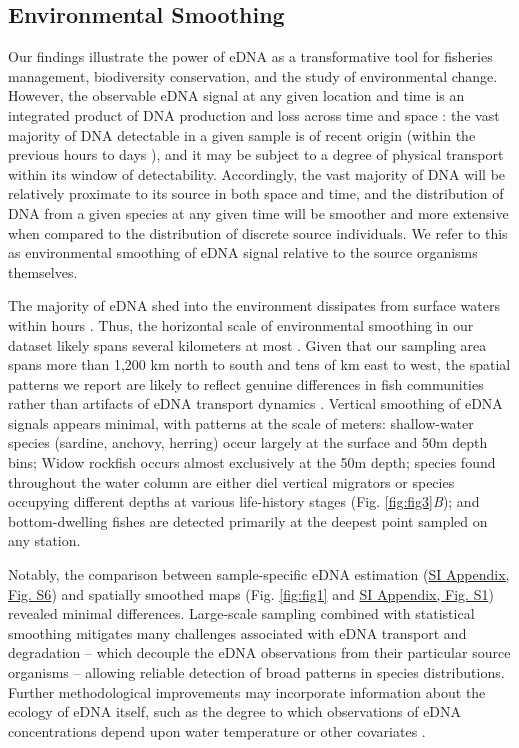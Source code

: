 \documentclass{article}
\begin{document}
\subsection*{Environmental Smoothing}
Our findings illustrate the power of eDNA as a transformative tool for fisheries management, biodiversity conservation, and the study of environmental change. However, the observable eDNA signal at any given location and time is an integrated product of DNA production and loss across time and space \cite{gold2023}: the vast majority of DNA detectable in a given sample is of recent origin (within the previous hours to days \cite{strickler2015,collins2018,machler2018}), and it may be subject to a degree of physical transport within its window of detectability. Accordingly, the vast majority of DNA will be relatively proximate to its source in both space and time, and the distribution of DNA from a given species at any given time will be smoother and more extensive when compared to the distribution of discrete source individuals. We refer to this as environmental smoothing of eDNA signal relative to the source organisms themselves. 

The majority of eDNA shed into the environment dissipates from surface waters within hours \cite{andruszkiewiczallan2021}. Thus, the horizontal scale of environmental smoothing in our dataset likely spans several kilometers at most \cite{baetscher2024}. Given that our sampling area spans more than 1,200 km north to south and tens of km east to west, the spatial patterns we report are likely to reflect genuine differences in fish communities rather than artifacts of eDNA transport dynamics \cite{guri2023}. Vertical smoothing of eDNA signals appears minimal, with patterns at the scale of meters: shallow-water species (sardine, anchovy, herring) occur largely at the surface and 50m depth bins; Widow rockfish occurs almost exclusively at the 50m depth; species found throughout the water column are either diel vertical migrators or species occupying different depths at various life-history stages (Fig. \ref{fig:fig3}\textit{B}); and bottom-dwelling fishes are detected primarily at the deepest point sampled on any station. 

Notably, the comparison between sample-specific eDNA estimation (\href{SI_Appendix.pdf}{SI Appendix, Fig. S6}) and spatially smoothed maps (Fig. \ref{fig:fig1} and \href{SI_Appendix.pdf}{SI Appendix, Fig. S1}) revealed minimal differences. Large-scale sampling combined with statistical smoothing mitigates many challenges associated with eDNA transport and degradation -- which decouple the eDNA observations from their particular source organisms -- allowing reliable detection of broad patterns in species distributions. Further methodological improvements may incorporate information about the ecology of eDNA itself, such as the degree to which observations of eDNA concentrations depend upon water temperature or other covariates \cite{jo2019b}. 
\end{document}
